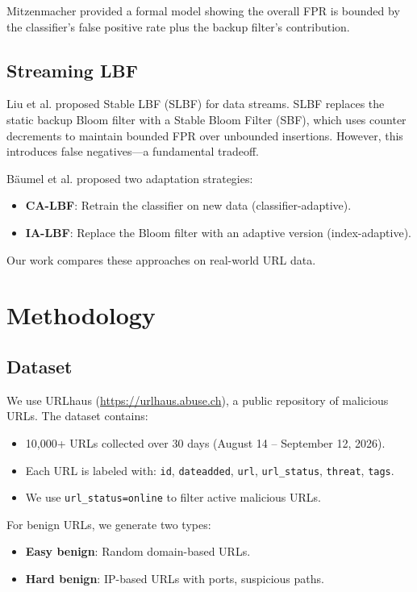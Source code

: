 \documentclass[11pt,a4paper]{article}
\begin{document}
Mitzenmacher \cite{mitzenmacher2018} provided a formal model showing the overall FPR is bounded by the classifier's false positive rate plus the backup filter's contribution.

\subsection{Streaming LBF}

Liu et al. \cite{liu2020} proposed Stable LBF (SLBF) for data streams. SLBF replaces the static backup Bloom filter with a Stable Bloom Filter (SBF), which uses counter decrements to maintain bounded FPR over unbounded insertions. However, this introduces false negatives---a fundamental tradeoff.

B\"aumel et al. \cite{baumel2021} proposed two adaptation strategies:
\begin{itemize}
    \item \textbf{CA-LBF}: Retrain the classifier on new data (classifier-adaptive).
    \item \textbf{IA-LBF}: Replace the Bloom filter with an adaptive version (index-adaptive).
\end{itemize}

Our work compares these approaches on real-world URL data.

\section{Methodology}

\subsection{Dataset}

We use URLhaus (\url{https://urlhaus.abuse.ch}), a public repository of malicious URLs. The dataset contains:
\begin{itemize}
    \item 10,000+ URLs collected over 30 days (August 14 -- September 12, 2026).
    \item Each URL is labeled with: \texttt{id}, \texttt{dateadded}, \texttt{url}, \texttt{url\_status}, \texttt{threat}, \texttt{tags}.
    \item We use \texttt{url\_status=online} to filter active malicious URLs.
\end{itemize}

For benign URLs, we generate two types:
\begin{itemize}
    \item \textbf{Easy benign}: Random domain-based URLs.
    \item \textbf{Hard benign}: IP-based URLs with ports, suspicious paths.
\end{itemize}
\end{document}
